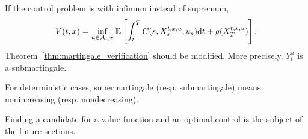 \documentclass[11pt]{book}
\newcommand{\dd}{\text{\normalfont d}}
\newcommand{\dt}{\text{\normalfont d}t}
\newcommand{\ds}{\text{\normalfont d}s}
\newcommand{\dW}{\text{\normalfont d}W}
\begin{document}
\begin{rem}\label{rem:inf_submartingale}
If the control problem is with infimum instead of supremum,
\begin{equation}
V(t,x)=\inf_{u\in\mathcal{A}_{t,T}}\mathbb{E}\left[\int_{t}^{T}C(s,X_s^{t,x,u},u_s){\dt}+g(X_T^{t,x,u})\right],
\end{equation}
Theorem~\ref{thm:martingale_verification} should be modified. More precisely, $Y_t^u$ is a submartingale. 

For deterministic cases, supermartingale (resp. submartingale) means nonincreasing (resp. nondecreasing).
\end{rem}
Finding a candidate for a value function and an optimal control is the subject of the future sections.
\end{document}
